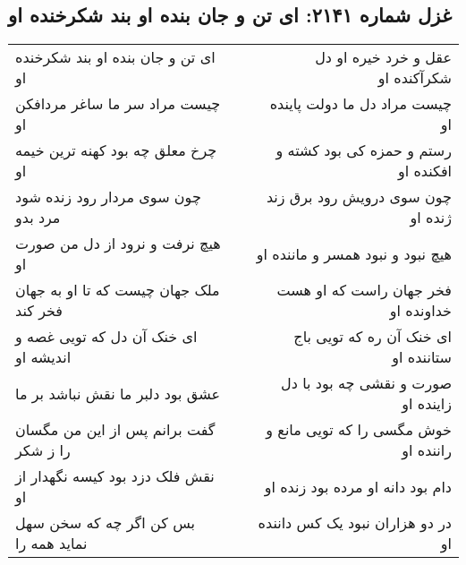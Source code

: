 \begin{center}
\section*{غزل شماره ۲۱۴۱: ای تن و جان بنده او بند شکرخنده او}
\label{sec:2141}
\begin{longtable}{l p{0.5cm} r}
ای تن و جان بنده او بند شکرخنده او
&&
عقل و خرد خیره او دل شکرآکنده او
\\
چیست مراد سر ما ساغر مردافکن او
&&
چیست مراد دل ما دولت پاینده او
\\
چرخ معلق چه بود کهنه ترین خیمه او
&&
رستم و حمزه کی بود کشته و افکنده او
\\
چون سوی مردار رود زنده شود مرد بدو
&&
چون سوی درویش رود برق زند ژنده او
\\
هیچ نرفت و نرود از دل من صورت او
&&
هیچ نبود و نبود همسر و ماننده او
\\
ملک جهان چیست که تا او به جهان فخر کند
&&
فخر جهان راست که او هست خداونده او
\\
ای خنک آن دل که تویی غصه و اندیشه او
&&
ای خنک آن ره که تویی باج ستاننده او
\\
عشق بود دلبر ما نقش نباشد بر ما
&&
صورت و نقشی چه بود با دل زاینده او
\\
گفت برانم پس از این من مگسان را ز شکر
&&
خوش مگسی را که تویی مانع و راننده او
\\
نقش فلک دزد بود کیسه نگهدار از او
&&
دام بود دانه او مرده بود زنده او
\\
بس کن اگر چه که سخن سهل نماید همه را
&&
در دو هزاران نبود یک کس داننده او
\\
\end{longtable}
\end{center}
